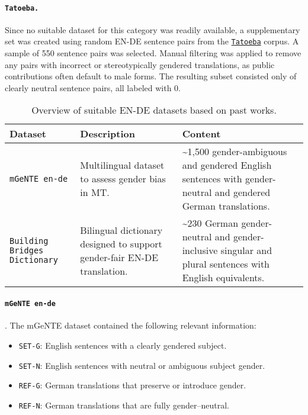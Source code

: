 \paragraph{\texttt{Tatoeba.}} Since no suitable dataset for this category was readily available, a supplementary set was created using random EN-DE sentence pairs from the \href{https://tatoeba.org/en/}{\texttt{Tatoeba}} corpus. A sample of 550 sentence pairs was selected. Manual filtering was applied to remove any pairs with incorrect or stereotypically gendered translations, as public contributions often default to male forms. The resulting subset consisted only of clearly neutral sentence pairs, all labeled with 0.

\begin{table}[ht!]
    \centering
    \renewcommand{\arraystretch}{1.3}
    \begin{tabularx}{\textwidth}{|>{\raggedright\arraybackslash}X|>{\raggedright\arraybackslash}X|>{\raggedright\arraybackslash}X|}
    \hline
    \textbf{Dataset} & \textbf{Description} & \textbf{Content} \\ \hline
    \texttt{mGeNTE en-de} \citep{savoldiMGeNTEMultilingualResource2025} & Multilingual dataset to assess gender bias in MT. & \textasciitilde1,500 gender-ambiguous and gendered English sentences with gender-neutral and gendered German translations. \\ \hline
    \texttt{Building Bridges Dictionary} \citep{lardelliBuildingBridgesDataset2024} & Bilingual dictionary designed to support gender-fair EN-DE translation. & \textasciitilde230 German gender-neutral and gender-inclusive singular and plural sentences with English equivalents. \\ \hline
    \end{tabularx}
    \caption{Overview of suitable EN-DE datasets based on past works.}
    \label{tab:available_datasets}
\end{table}

\paragraph {\texttt{mGeNTE en-de}}. The mGeNTE dataset contained the following relevant information:  

\begin{itemize}  
  \item \texttt{SET-G}: English sentences with a clearly gendered subject.  
  \item \texttt{SET-N}: English sentences with neutral or ambiguous subject gender.  
  \item \texttt{REF-G}: German translations that preserve or introduce gender.  
  \item \texttt{REF-N}: German translations that are fully gender–neutral.  
\end{itemize}  

